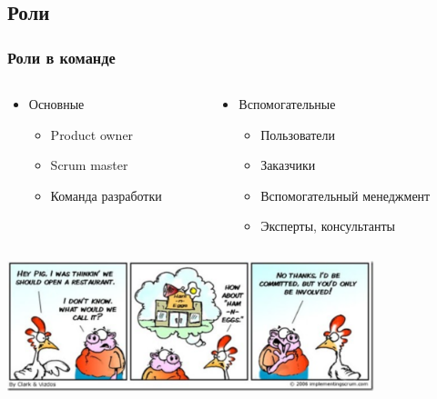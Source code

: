 \documentclass{../../slides-style}
\begin{document}
    \subsection{Роли}

    \begin{frame}
        \frametitle{Роли в команде}
        \begin{columns}
            \begin{column}{0.5\textwidth}
                \begin{itemize}
                    \item Основные 
                    \begin{itemize}
                        \item Product owner
                        \item Scrum master
                        \item Команда разработки
                    \end{itemize}
                \end{itemize}
            \end{column}
            \begin{column}{0.5\textwidth}
                \begin{itemize}
                    \item Вспомогательные 
                    \begin{itemize}
                        \item Пользователи
                        \item Заказчики
                        \item Вспомогательный менеджмент
                        \item Эксперты, консультанты
                    \end{itemize}
                \end{itemize}
            \end{column}
        \end{columns}
        \begin{center}
            \includegraphics[width=0.8\textwidth]{ham-and-eggs.png}
        \end{center}
    \end{frame}
\end{document}
